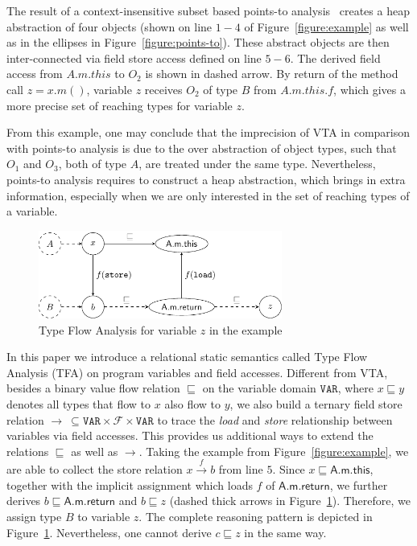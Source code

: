 \documentclass{llncs}
\newcommand\Var{\mathtt{VAR}}
\newcommand{\Field}{\mathcal{F}}
\newcommand{\less}{\sqsubseteq}
\newcommand{\hflow}{\longrightarrow}
\newcommand{\lhflow}[1]{\stackrel{#1}{\hflow}}
\begin{document}
The result of a context-insensitive subset based points-to analysis~\cite{andersen94} creates a heap abstraction of four objects (shown on line $1-4$ of Figure~\ref{figure:example} as well as in the ellipses in Figure~\ref{figure:points-to}). These abstract objects are then inter-connected via field store access defined on line $5-6$. The derived field access from $A.m.this$ to $O_2$ is shown in dashed arrow. By return of the method call $z=x.m()$, variable $z$ receives $O_2$ of type $B$ from $A.m.this.f$, which gives a more precise set of reaching types for variable $z$.

From this example, one may conclude that the imprecision of VTA in comparison with points-to analysis is due to the over abstraction of object types, such that $O_1$ and $O_3$, both of type $A$, are treated under the same type. Nevertheless, points-to analysis requires to construct a heap abstraction, which brings in extra information, especially when we are only interested in the set of reaching types of a variable.

\begin{figure}[t!]
\centering
\includegraphics[width=8cm]{tfa.pdf}
\caption{Type Flow Analysis for variable $z$ in the example}\label{fig:tfa}
\end{figure}

In this paper we introduce a relational static semantics called Type Flow Analysis (TFA) on program variables and field accesses. Different from VTA, besides a binary value flow relation $\less$ on the variable domain $\Var$, where $x\less y$ denotes all types that flow to $x$ also flow to $y$, we also build a ternary field store relation $\rightarrow\ \subseteq\Var\times\Field\times\Var$ to trace the \emph{load} and \emph{store} relationship between variables via field accesses. This provides us additional ways to extend the relations $\less$ as well as $\rightarrow$. %
Taking the example from Figure~\ref{figure:example}, we are able to collect the store relation $x\lhflow{f}b$ from line $5$. Since $x\less \textsf{A.m.this}$, together with the implicit assignment which loads $f$ of $\textsf{A.m.return}$, we further derives $b\less\textsf{A.m.return}$ and $b\less z$ (dashed thick arrows in Figure~\ref{fig:tfa}). Therefore, we assign type $B$ to variable $z$. The complete reasoning pattern is depicted in Figure~\ref{fig:tfa}. Nevertheless, one cannot derive $c\less z$ in the same way.
\end{document}
